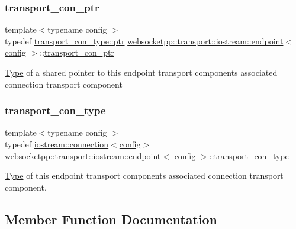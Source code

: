 \subsubsection{\texorpdfstring{transport\+\_\+con\+\_\+ptr}{transport\_con\_ptr}}
{\footnotesize\ttfamily template$<$typename config $>$ \\
typedef \mbox{\hyperlink{classwebsocketpp_1_1transport_1_1iostream_1_1connection_a054436e87f6dc4404b13f6131707d2ab}{transport\+\_\+con\+\_\+type\+::ptr}} \mbox{\hyperlink{classwebsocketpp_1_1transport_1_1iostream_1_1endpoint}{websocketpp\+::transport\+::iostream\+::endpoint}}$<$ \mbox{\hyperlink{classconfig}{config}} $>$\+::\mbox{\hyperlink{classwebsocketpp_1_1transport_1_1iostream_1_1endpoint_a709bba4a4e1e2b7829abe4aa55de8078}{transport\+\_\+con\+\_\+ptr}}}

\mbox{\hyperlink{struct_type}{Type}} of a shared pointer to this endpoint transport component\textquotesingle{}s associated connection transport component \mbox{\label{classwebsocketpp_1_1transport_1_1iostream_1_1endpoint_a01827f94c5d01289975146f0438ee79b}} 
\subsubsection{\texorpdfstring{transport\+\_\+con\+\_\+type}{transport\_con\_type}}
{\footnotesize\ttfamily template$<$typename config $>$ \\
typedef \mbox{\hyperlink{classwebsocketpp_1_1transport_1_1iostream_1_1connection}{iostream\+::connection}}$<$\mbox{\hyperlink{classconfig}{config}}$>$ \mbox{\hyperlink{classwebsocketpp_1_1transport_1_1iostream_1_1endpoint}{websocketpp\+::transport\+::iostream\+::endpoint}}$<$ \mbox{\hyperlink{classconfig}{config}} $>$\+::\mbox{\hyperlink{classwebsocketpp_1_1transport_1_1iostream_1_1endpoint_a01827f94c5d01289975146f0438ee79b}{transport\+\_\+con\+\_\+type}}}

\mbox{\hyperlink{struct_type}{Type}} of this endpoint transport component\textquotesingle{}s associated connection transport component. 

\subsection{Member Function Documentation}
\mbox{\label{classwebsocketpp_1_1transport_1_1iostream_1_1endpoint_a72e24fecb98d0445eb7df64d6b94a6a8}} 
